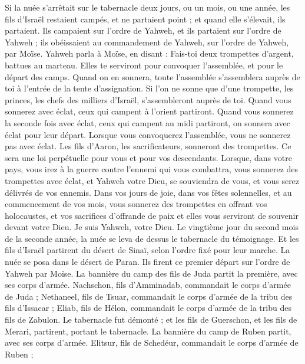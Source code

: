 \begin{multicols}{2}
Si la nuée s'arrêtait sur le tabernacle deux jours, ou un mois, ou une année, les fils d'Israël restaient campés, et ne partaient point ; et quand elle s’élevait, ils partaient.
Ils campaient sur l’ordre de Yahweh, et ils partaient sur l’ordre de Yahweh ; ils obéissaient au commandement de Yahweh, sur l’ordre de Yahweh, par Moïse.
\VerseOne{}Yahweh parla à Moïse, en disant :
Fais-toi deux trompettes d'argent, battues au marteau. Elles te serviront pour convoquer l'assemblée, et pour le départ des camps.
Quand on en sonnera, toute l'assemblée s'assemblera auprès de toi à l'entrée de la tente d'assignation.
Si l’on ne sonne que d'une trompette, les princes, les chefs des milliers d'Israël, s'assembleront auprès de toi.
Quand vous sonnerez avec éclat, ceux qui campent à l'orient partiront.
Quand vous sonnerez la seconde fois avec éclat, ceux qui campent au midi partiront, on sonnera avec éclat pour leur départ.
Lorsque vous convoquerez l'assemblée, vous ne sonnerez pas avec éclat.
Les fils d'Aaron, les sacrificateurs, sonneront des trompettes. Ce sera une loi perpétuelle pour vous et pour vos descendants.
Lorsque, dans votre pays, vous irez à la guerre contre l’ennemi qui vous combattra, vous sonnerez des trompettes avec éclat, et Yahweh votre Dieu, se souviendra de vous, et vous serez délivrés de vos ennemis.
Dans vos jours de joie, dans vos fêtes solennelles, et au commencement de vos mois, vous sonnerez des trompettes en offrant vos holocaustes, et vos sacrifices d’offrande de paix et elles vous serviront de souvenir devant votre Dieu. Je suis Yahweh, votre Dieu.
Le vingtième jour du second mois de la seconde année, la nuée se leva de dessus le tabernacle du témoignage.
Et les fils d'Israël partirent du désert de Sinaï, selon l’ordre fixé pour leur marche. La nuée se posa dans le désert de Paran.
Ils firent ce premier départ sur l’ordre de Yahweh par Moïse.
La bannière du camp des fils de Juda partit la première, avec ses corps d’armée. Nachschon, fils d’Amminadab, commandait le corps d’armée de Juda ;
Nethaneel, fils de Tsuar, commandait le corps d’armée de la tribu des fils d'Issacar ;
Eliab, fils de Hélon, commandait le corps d’armée de la tribu des fils de Zabulon.
Le tabernacle fut démonté ; et les fils de Guerschon, et les fils de Merari, partirent, portant le tabernacle.
La bannière du camp de Ruben partit, avec ses corps d’armée. Elitsur, fils de Schedéur, commandait le corps d’armée de Ruben ;

\end{multicols}
